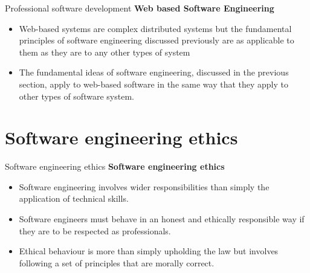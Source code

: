 \documentclass{beamer}
\begin{document}
\begin{frame}{{Professional software development}}
	\textbf{Web based Software Engineering}
	\begin{itemize}
		\item Web-based systems are complex distributed systems but the fundamental principles of 
		software engineering discussed previously are as applicable to them as they are to any other types of system
		\item The fundamental ideas of software engineering, discussed in the previous section, 
		apply to web-based software in the same way that they apply to other types of software system.
	\end{itemize}
\end{frame}
\section{Software engineering ethics}
\begin{frame}{Software engineering ethics}
	\textbf{Software engineering ethics}
\begin{itemize}
	\item Software engineering involves wider responsibilities than simply the application of technical skills.
	\item Software engineers must behave in an honest and ethically responsible way if they are to be respected as professionals.
	\item Ethical behaviour is more than simply upholding the law but involves following a set of principles that are morally correct.
\end{itemize}
\end{frame}
\end{document}
